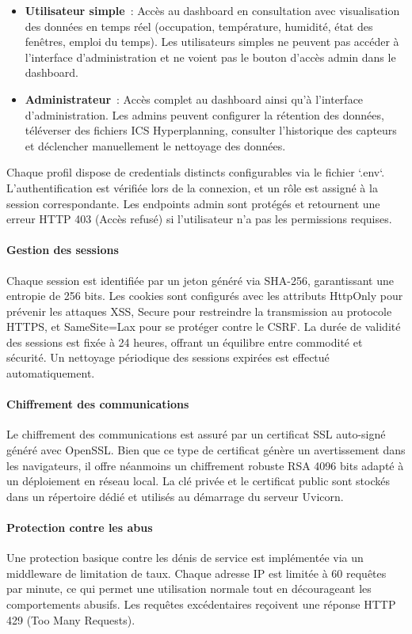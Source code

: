 \documentclass[a4paper,12pt]{report}
\begin{document}
\begin{itemize}
    \item \textbf{Utilisateur simple}~: Accès au dashboard en consultation avec visualisation des données en temps réel (occupation, température, humidité, état des fenêtres, emploi du temps). Les utilisateurs simples ne peuvent pas accéder à l'interface d'administration et ne voient pas le bouton d'accès admin dans le dashboard.
    \item \textbf{Administrateur}~: Accès complet au dashboard ainsi qu'à l'interface d'administration. Les admins peuvent configurer la rétention des données, téléverser des fichiers ICS Hyperplanning, consulter l'historique des capteurs et déclencher manuellement le nettoyage des données.
\end{itemize}

Chaque profil dispose de credentials distincts configurables via le fichier `.env`. L'authentification est vérifiée lors de la connexion, et un rôle est assigné à la session correspondante. Les endpoints admin sont protégés et retournent une erreur HTTP 403 (Accès refusé) si l'utilisateur n'a pas les permissions requises.

\paragraph*{Gestion des sessions} Chaque session est identifiée par un jeton généré via SHA-256, garantissant une entropie de 256 bits. Les cookies sont configurés avec les attributs HttpOnly pour prévenir les attaques XSS, Secure pour restreindre la transmission au protocole HTTPS, et SameSite=Lax pour se protéger contre le CSRF. La durée de validité des sessions est fixée à 24 heures, offrant un équilibre entre commodité et sécurité. Un nettoyage périodique des sessions expirées est effectué automatiquement.

\paragraph*{Chiffrement des communications} Le chiffrement des communications est assuré par un certificat SSL auto-signé généré avec OpenSSL. Bien que ce type de certificat génère un avertissement dans les navigateurs, il offre néanmoins un chiffrement robuste RSA 4096 bits adapté à un déploiement en réseau local. La clé privée et le certificat public sont stockés dans un répertoire dédié et utilisés au démarrage du serveur Uvicorn.

\paragraph*{Protection contre les abus} Une protection basique contre les dénis de service est implémentée via un middleware de limitation de taux. Chaque adresse IP est limitée à 60 requêtes par minute, ce qui permet une utilisation normale tout en décourageant les comportements abusifs. Les requêtes excédentaires reçoivent une réponse HTTP 429 (Too Many Requests).
\end{document}
